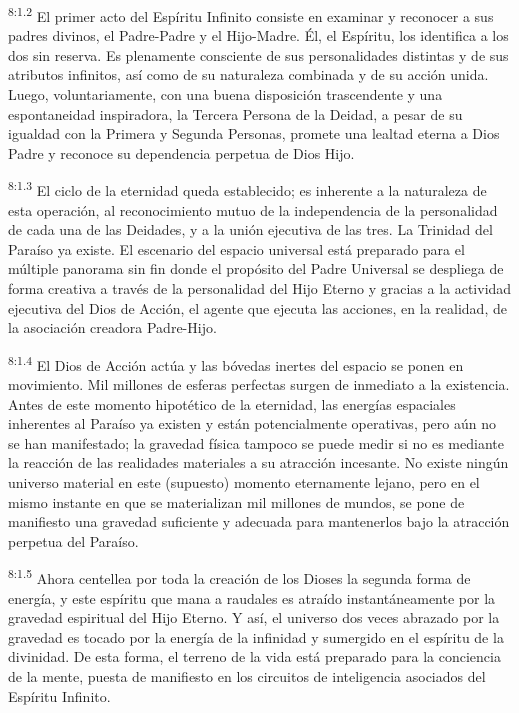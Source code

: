 \par
\textsuperscript{8:1.2} El primer acto del Espíritu Infinito consiste en examinar y reconocer a sus padres divinos, el Padre-Padre y el Hijo-Madre. Él, el Espíritu, los identifica a los dos sin reserva. Es plenamente consciente de sus personalidades distintas y de sus atributos infinitos, así como de su naturaleza combinada y de su acción unida. Luego, voluntariamente, con una buena disposición trascendente y una espontaneidad inspiradora, la Tercera Persona de la Deidad, a pesar de su igualdad con la Primera y Segunda Personas, promete una lealtad eterna a Dios Padre y reconoce su dependencia perpetua de Dios Hijo.

\par
\textsuperscript{8:1.3} El ciclo de la eternidad queda establecido; es inherente a la naturaleza de esta operación, al reconocimiento mutuo de la independencia de la personalidad de cada una de las Deidades, y a la unión ejecutiva de las tres. La Trinidad del Paraíso ya existe. El escenario del espacio universal está preparado para el múltiple panorama sin fin donde el propósito del Padre Universal se despliega de forma creativa a través de la personalidad del Hijo Eterno y gracias a la actividad ejecutiva del Dios de Acción, el agente que ejecuta las acciones, en la realidad, de la asociación creadora Padre-Hijo.

\par
\textsuperscript{8:1.4} El Dios de Acción actúa y las bóvedas inertes del espacio se ponen en movimiento. Mil millones de esferas perfectas surgen de inmediato a la existencia. Antes de este momento hipotético de la eternidad, las energías espaciales inherentes al Paraíso ya existen y están potencialmente operativas, pero aún no se han manifestado; la gravedad física tampoco se puede medir si no es mediante la reacción de las realidades materiales a su atracción incesante. No existe ningún universo material en este
(supuesto) momento eternamente lejano, pero en el mismo instante en que se materializan mil millones de mundos, se pone de manifiesto una gravedad suficiente y adecuada para mantenerlos bajo la atracción perpetua del Paraíso.

\par
\textsuperscript{8:1.5} Ahora centellea por toda la creación de los Dioses la segunda forma de energía, y este espíritu que mana a raudales es atraído instantáneamente por la gravedad espiritual del Hijo Eterno. Y así, el universo dos veces abrazado por la gravedad es tocado por la energía de la infinidad y sumergido en el espíritu de la divinidad. De esta forma, el terreno de la vida está preparado para la conciencia de la mente, puesta de manifiesto en los circuitos de inteligencia asociados del Espíritu Infinito.

